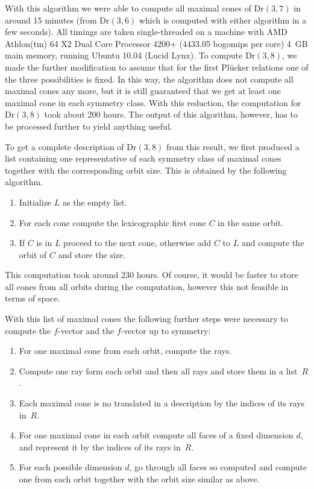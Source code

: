 \documentclass[11pt,a4paper]{amsart}
\newcommand{\Dr}[2]{{\mathrm{Dr}(#1,#2)}}
\theoremstyle{plain}
\theoremstyle{definition}
\begin{document}
With this algorithm we were able to compute all maximal cones of $\Dr{3}{7}$ in around 15 minutes (from
$\Dr 36$ which is computed with either algorithm in a few seconds).  All timings are taken
single-threaded on a machine with AMD Athlon(tm) 64 X2 Dual Core Processor 4200+ (4433.05 bogomips
per core) 4~GB main memory, running Ubuntu 10.04 (Lucid Lynx).  To compute $\Dr 38$, we made the
further modification to assume that for the first Pl\"ucker relations one of the three possibilities
is fixed. In this way, the algorithm does not compute all maximal cones any more, but it is still
guaranteed that we get at least one maximal cone in each symmetry class.  With this reduction, the
computation for $\Dr 38$ took about 200 hours.  The output of this algorithm, however, has to be
processed further to yield anything useful.

To get a complete description of $\Dr 38$ from this result, we first produced a list containing one
representative of each symmetry class of maximal cones together with the corresponding orbit
size. This is obtained by the following algorithm.

\begin{enumerate}
\item Initialize $L$ as the empty list.
\item For each cone compute the lexicographic first cone $C$ in the same orbit.
\item If $C$ is in $L$ proceed to the next cone, otherwise add $C$ to $L$ and compute the orbit of
  $C$ and store the size.
\end{enumerate}

This computation took around 230 hours.  Of course, it would be faster to store all cones
from all orbits during the computation, however this not feasible in terms of space.

With this list of maximal cones the following further steps were necessary to compute the
$f$-vector and the $f$-vector up to symmetry:

\begin{enumerate}
\item For one maximal cone from each orbit, compute the rays.
\item Compute one ray form each orbit and then all rays and store them in a list~$R$.
\item Each maximal cone is no translated in a description by the indices of its rays in~$R$.
\item For one maximal cone in each orbit compute all faces of a fixed dimension $d$, and represent
  it by the indices of its rays in~$R$.
\item For each possible dimension $d$, go through all faces so computed and compute one from each
  orbit together with the orbit size similar as above.
\end{enumerate}
\end{document}
